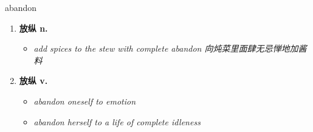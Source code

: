 
\begin{frame}
{\huge abandon}
\begin{center}
\begin{enumerate}\Large
  \item \textbf{放纵 n.}
  \begin{itemize}
    \item \em{\Large{add spices to the stew with complete abandon 向炖菜里面肆无忌惮地加酱料}}
  \end{itemize}
  \item \textbf{放纵 v.}
  \begin{itemize}
    \item \em{\Large{abandon oneself to emotion}}
    \item \em{\Large{abandon herself to a life of complete idleness}}
  \end{itemize}
\end{enumerate}
\end{center}
\end{frame}

